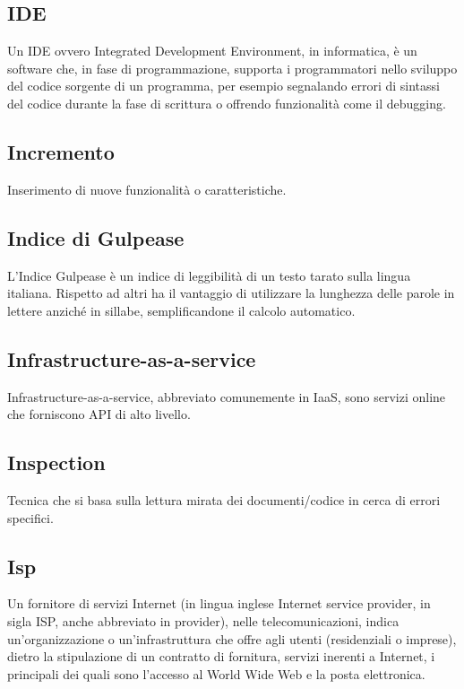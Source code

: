 

\subsection*{IDE}
Un IDE ovvero Integrated Development Environment, in informatica, è un software che, in fase di programmazione, supporta i programmatori nello sviluppo del codice sorgente di un programma, per esempio segnalando errori di sintassi del codice durante la fase di scrittura o offrendo funzionalità come il debugging.

\subsection*{Incremento}
Inserimento di nuove funzionalità o caratteristiche.

\subsection*{Indice di Gulpease}
L'Indice Gulpease è un indice di leggibilità di un testo tarato sulla lingua italiana. Rispetto ad altri ha il vantaggio di utilizzare la lunghezza delle parole in lettere anziché in sillabe, semplificandone il calcolo automatico.

\subsection*{Infrastructure-as-a-service}
Infrastructure-as-a-service, abbreviato comunemente in IaaS, sono servizi online che forniscono API di alto livello.

\subsection*{Inspection}
Tecnica che si basa sulla lettura mirata dei documenti/codice in cerca di errori specifici.

\subsection*{Isp}
Un fornitore di servizi Internet (in lingua inglese Internet service provider, in sigla ISP, anche abbreviato in provider), nelle telecomunicazioni, indica un'organizzazione o un'infrastruttura che offre agli utenti (residenziali o imprese), dietro la stipulazione di un contratto di fornitura, servizi inerenti a Internet, i principali dei quali sono l'accesso al World Wide Web e la posta elettronica. 

